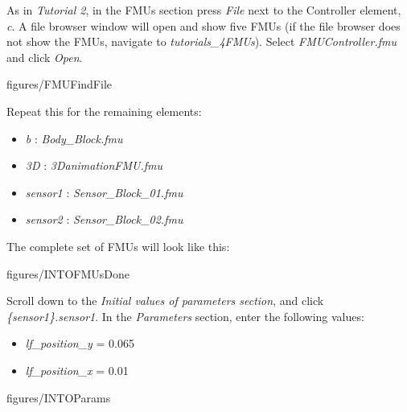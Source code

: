 \documentclass[11pt,a4paper]{../tutorial}
\begin{document}
\begin{instructions}
\item As in \emph{Tutorial 2}, in the FMUs section press \emph{File} next to the Controller element, \emph{c}. A file browser window will open and show five FMUs (if the file browser does not show the FMUs, navigate to \emph{tutorials\_4\pathsep{}FMUs}). Select \emph{FMUController.fmu} and click \emph{Open}.

    \begin{annotation}[width=0.8\linewidth]{figures/FMUFindFile}
    \end{annotation}

\item Repeat this for the remaining elements:
    \begin{itemize}
        \item \emph{b} : \emph{Body\_Block.fmu}
        \item \emph{3D} : \emph{3DanimationFMU.fmu}
        \item \emph{sensor1} : \emph{Sensor\_Block\_01.fmu}
    \item \emph{sensor2} : \emph{Sensor\_Block\_02.fmu}
    \end{itemize}

    The complete set of FMUs will look like this:

    \begin{annotation}[width=0.85\linewidth,trim=0 0 0 0,clip]{figures/INTOFMUsDone}
    \end{annotation}

\newpage
\item Scroll down to the \emph{Initial values of parameters section}, and click \emph{\{sensor1\}.sensor1}. In the \emph{Parameters} section, enter the following values:

    \begin{itemize}
        \item \emph{lf\_position\_y} = 0.065
        \item \emph{lf\_position\_x} = 0.01
    \end{itemize}

    \begin{annotation}[width=0.8\linewidth]{figures/INTOParams}
    \end{annotation}


\end{instructions}
\end{document}
